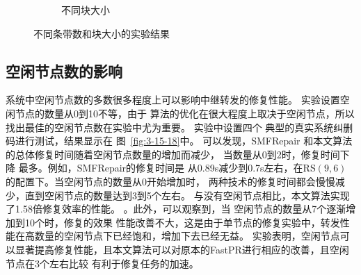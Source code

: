 \begin{figure}[htbp]
\begin{subfigure}[t]{0.4\textwidth}
		\caption{不同块大小}
		\label{fig:3-14}
	\end{subfigure}
	\caption{不同条带数和块大小的实验结果}
	\label{fig:3-12-14}
\end{figure}

\subsection{空闲节点数的影响}

系统中空闲节点数的多数很多程度上可以影响中继转发的修复性能。
实验设置空闲节点的数量从0到10不等，由于
算法的优化在很大程度上取决于空闲节点，所以找出最佳的空闲节点数在实验中尤为重要。
实验中设置四个
典型的真实系统纠删码进行测试，结果显示在
图~\ref{fig:3-15-18}中。
可以发现，SMFRepair
和本文算法的总体修复时间随着空闲节点数量的增加而减少，
当数量从0到2时，修复时间下降
最多。例如，SMFRepair的修复时间是
从0.89s减少到0.7s左右，在RS$(9,6)$的配置下。当空闲节点的数量从0开始增加时，
两种技术的修复时间都会慢慢减少，直到空闲节点的数量达到3到5个左右。
与没有空闲节点相比，本文算法实现了1.58倍修复效率的性能。
。此外，可以观察到，当
空闲节点的数量从7个逐渐增加到10个时，修复的效果
性能改善不大，这是由于单节点的修复实验中，转发性能在高数量的空闲节点下已经饱和，增加下去已经无益。
实验表明，空闲节点可以显著提高修复性能，且本文算法可以对原本的FastPR进行相应的改善，且空闲节点在3个左右比较
有利于修复任务的加速。



